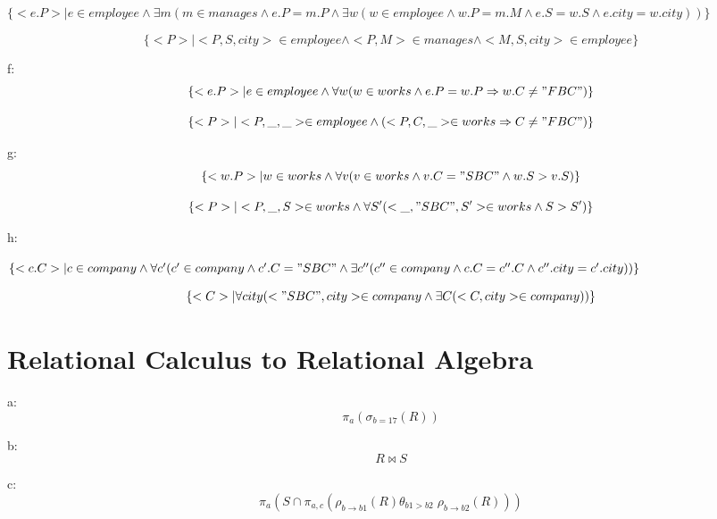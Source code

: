 \documentclass[12pt,a4paper,draft]{report}
\begin{document}
$\{<e.P>| e \in employee \land \exists m (m \in manages \land e.P = m.P \land \exists w ( w \in employee \land w.P = m.M \land e.S = w.S \land e.city = w.city))\}$

$$\{<P>|<P,S,city> \in employee \land <P,M> \in manages \land <M,S,city> \in employee\}$$

f:
$$\{<e.P>| e \in employee \land \forall w (w \in works \land e.P = w.P \Rightarrow w.C \neq "FBC")\}$$

$$\{<P>|<P,\_,\_> \in employee \land (<P,C,\_> \in works \Rightarrow C \neq "FBC")\}$$

g:
$$\{<w.P>| w \in works \land \forall v (v \in works \land v.C ="SBC" \land w.S > v.S)\}$$

$$\{<P>|<P,\_,S> \in works \land \forall S' ( <\_, "SBC", S'> \in works \land S > S')\}$$

h:

$\{<c.C>|c \in company \land \forall c' (c' \in company \land c'.C = "SBC" \land \exists c'' (c'' \in company \land c.C = c''.C \land c''.city =c'.city))\}$

$$\{<C>| \forall city (<"SBC",city> \in company \land \exists C (<C,city> \in company)) \}$$

\section{Relational Calculus to Relational Algebra}
a:
$$\pi_a(\sigma_{b=17}(R))$$

b:
$$R \bowtie S$$

c:
$$\pi_a(S \cap \pi_{a,c}(\rho_{b\rightarrow b1}(R)\theta_{b1 > b2} \; \rho_{b\rightarrow b2}(R)))$$
\end{document}
